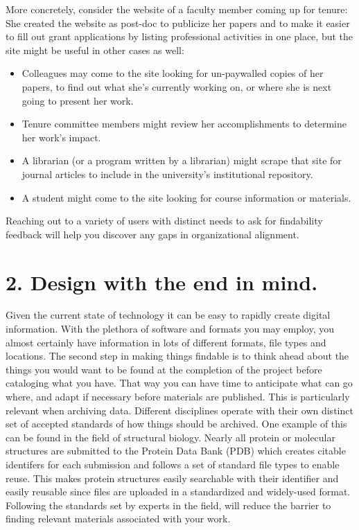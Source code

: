 \documentclass[10pt,letterpaper]{article}
\newcommand{\rulemajor}[1]{\section*{#1}}
\begin{document}
More concretely, consider the website of a faculty member coming up for tenure:
She created the website as post-doc to publicize her papers and to make it
easier to fill out grant applications by listing professional activities in one
place, but the site might be useful in other cases as well:

\begin{itemize}

\item
  Colleagues may come to the site looking for un-paywalled copies of her
  papers, to find out what she's currently working on, or where she is next
  going to present her work.

\item
  Tenure committee members might review her accomplishments to determine her
  work's impact.

\item
  A librarian (or a program written by a librarian) might scrape that site for
  journal articles to include in the university's institutional repository.

\item
  A student might come to the site looking for course information or materials.

\end{itemize}

Reaching out to a variety of users with distinct needs to ask for findability feedback will
help you discover any gaps in organizational alignment.

\rulemajor{2. Design with the end in mind.}

Given the current state of technology it can be easy to rapidly create digital
information. With the plethora of software and formats you may employ, you almost
certainly have information in lots of different formats, file types and locations.
The second step in making things findable is to think ahead about the things you
would want to be found at the completion of the project before cataloging what you
have. That way you can have time to anticipate what can go where, and adapt if
necessary before materials are published. This is particularly relevant when
archiving data. Different disciplines operate with their own distinct set of
accepted standards of how things should be archived. One example of this can be
found in the field of structural biology. Nearly all protein or molecular
structures are submitted to the Protein Data Bank (PDB) which creates citable
identifers for each submission and follows a set of standard file types to enable 
reuse. This makes protein structures easily searchable with their identifier 
and easily reusable since files are uploaded in a standardized and widely-used 
format\cite{Wilkinson2016}. Following the standards set by experts in the field, 
will reduce the barrier to finding relevant materials associated with your work.
\end{document}
